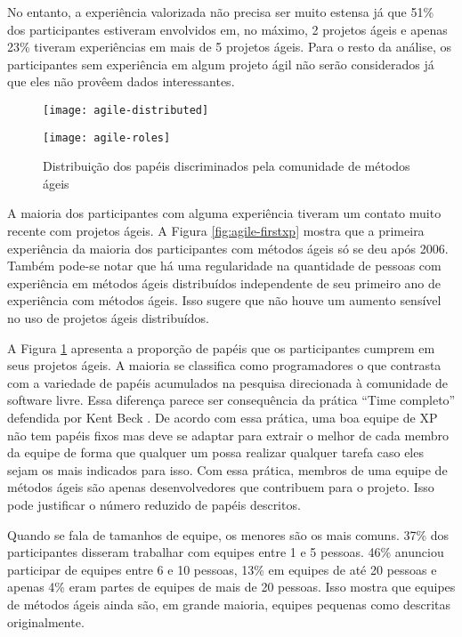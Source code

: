 No entanto, a experiência valorizada não precisa ser muito estensa já
que 51\% dos participantes estiveram envolvidos em, no máximo, 2
projetos ágeis e apenas 23\% tiveram experiências em mais de 5
projetos ágeis.  Para o resto da análise, os participantes sem
experiência em algum projeto ágil não serão considerados já que eles
não provêem dados interessantes.

\begin{figure}[thb]
  \begin{minipage}[t]{0.6\linewidth}
    \centering
    \texttt{[image: agile-distributed]}
    \caption{Ano da 1$^{\textrm{a}}$ experiência com métodos ágeis com
      experiência distribuída ou não}
    \label{fig:agile-firstxp}
  \end{minipage}
  \begin{minipage}[t]{0.4\linewidth}
    \centering
    \texttt{[image: agile-roles]}
    \caption{Distribuição dos papéis discriminados pela comunidade de métodos ágeis}
    \label{fig:agile-roles}
  \end{minipage}
\end{figure}

A maioria dos participantes com alguma experiência tiveram um contato
muito recente com projetos ágeis. A Figura \ref{fig:agile-firstxp}
mostra que a primeira experiência da maioria dos participantes com
métodos ágeis só se deu após 2006. Também pode-se notar que há uma
regularidade na quantidade de pessoas com experiência em métodos ágeis
distribuídos independente de seu primeiro ano de experiência com
métodos ágeis. Isso sugere que não houve um aumento sensível no uso de
projetos ágeis distribuídos.

A Figura \ref{fig:agile-roles} apresenta a proporção de papéis que os
participantes cumprem em seus projetos ágeis. A maioria se classifica
como programadores o que contrasta com a variedade de papéis
acumulados na pesquisa direcionada à comunidade de software
livre. Essa diferença parece ser consequência da prática ``Time
completo'' defendida por Kent Beck \cite{XP01}. De acordo com essa
prática, uma boa equipe de XP não tem papéis fixos mas deve se adaptar
para extrair o melhor de cada membro da equipe de forma que qualquer
um possa realizar qualquer tarefa caso eles sejam os mais indicados
para isso. Com essa prática, membros de uma equipe de métodos ágeis
são apenas desenvolvedores que contribuem para o projeto. Isso pode
justificar o número reduzido de papéis descritos.

Quando se fala de tamanhos de equipe, os menores são os mais
comuns. 37\% dos participantes disseram trabalhar com equipes entre 1
e 5 pessoas. 46\% anunciou participar de equipes entre 6 e 10 pessoas,
13\% em equipes de até 20 pessoas e apenas 4\% eram partes de equipes
de mais de 20 pessoas. Isso mostra que equipes de métodos ágeis ainda
são, em grande maioria, equipes pequenas como descritas originalmente.

